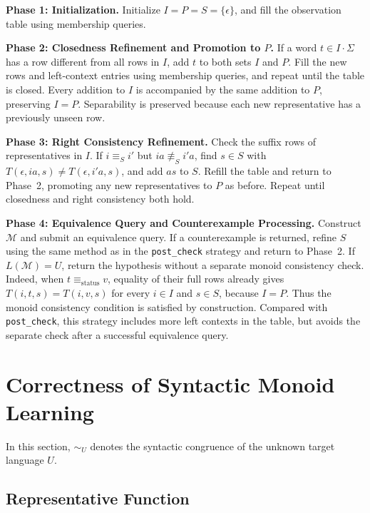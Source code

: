 \documentclass{ieice-tecrep}
\begin{document}
\textbf{Phase 1: Initialization.}
Initialize \(I=P=S=\{\epsilon\}\), and fill the observation table
using membership queries.

\textbf{Phase 2: Closedness Refinement and Promotion to \(P\).}
If a word \(t\in I\cdot\Sigma\) has a row different from all rows
in \(I\), add \(t\) to both sets \(I\) and \(P\).
Fill the new rows and left-context entries using membership queries,
and repeat until the table is closed. Every addition to \(I\) is
accompanied by the same addition to \(P\), preserving \(I = P\).
Separability is preserved because each new representative has a
previously unseen row.

\textbf{Phase 3: Right Consistency Refinement.}
Check the suffix rows of representatives in \(I\). If
\(i\equiv_S i'\) but \(ia\not\equiv_S i'a\), find \(s\in S\)
with \(T(\epsilon,ia,s)\neq T(\epsilon,i'a,s)\), and add \(as\)
to \(S\). Refill the table and return to Phase~2, promoting any new
representatives to \(P\) as before. Repeat until closedness and right
consistency both hold.

\textbf{Phase 4: Equivalence Query and Counterexample Processing.}
Construct \(\mathcal{M}\) and submit an equivalence query. If a
counterexample is returned, refine \(S\) using the same method as in
the \texttt{post\_check} strategy and return to Phase~2. If
\(L(\mathcal{M})=U\), return the hypothesis without a separate monoid
consistency check.
Indeed, when \(t\equiv_{\mathrm{status}}v\), equality of their full
rows already gives \(T(i,t,s)=T(i,v,s)\) for
every \(i\in I\) and \(s\in S\), because \(I=P\).
Thus the monoid consistency condition is satisfied by construction.
Compared with \texttt{post\_check}, this strategy includes more left
contexts in the table, but avoids the separate check after a successful
equivalence query.

\section{Correctness of Syntactic Monoid Learning}\label{main-results}

In this section, \(\sim_U\) denotes the syntactic congruence of the
unknown target language \(U\).

\subsection{Representative Function}\label{definition-representative-function}
\end{document}
